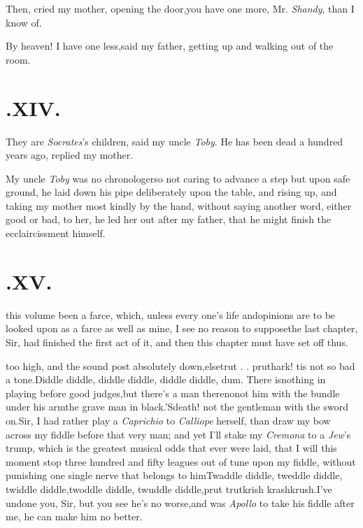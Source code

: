\documentclass{article}
\begin{document}
\vskip -2pt

\tsh  Then, cried my mother, opening the
door,\tsh you have one more, Mr. \textit{Shandy}, than I
know of.

\vskip -2pt

By heaven! I have one less,\tsk said my father, getting up and
walking out of the room.

\setlength{\baselineskip}{12.78pt}  %
\section{.\enspace  XIV.}

\quad\tsh They are \textit{Socrates}’s children, said my uncle
\textit{Toby}. He has been dead a hundred years ago, replied my
mother.

My uncle \textit{Toby} was no chronologer\tsk so not caring to
advance a step but upon safe ground, he laid down his pipe
deliberately upon the table, and rising up, and taking my mother
most kindly by the hand, without saying another word, either good
or bad, to her, he led her out after my father, that he might
finish the ecclaircissment himself.

\section{.\enspace  XV.}

 this volume been a farce,\break
which, unless every one’s life and\break opinions are to be looked upon as
a farce as well as mine, I see no reason to suppose\tsk the last
chapter, Sir, had finished
the first act of it, and then this
chapter must have set off thus.

\noindent
{}
too high, and the sound post absolutely
down,\tsk else\tsk trut . . prut\tsk hark! tis not so bad a
tone.\tsk Diddle diddle, diddle diddle, diddle diddle, dum.
There is\break nothing
in playing before good judges,\tsk but there’s a man
there\tsk no\tsk not him with the bundle under his arm\tsk the grave man
in black.\tsk ’Sdeath! not the gentleman with the sword on.\tsk Sir,
I had rather play a \textit{Caprichio} to \textit{Calliope} herself, than draw my
bow across my fiddle before that very man; and yet I’ll stake my
\textit{Cremona} to a \textit{Jew}’s trump, which is the greatest musical
odds that ever were laid, that I will this moment stop three hundred and fifty
leagues out of tune upon my fiddle, without punish\-ing one single nerve that
belongs to him\break\tsk Twaddle diddle, tweddle
diddle,\tsk\break
twiddle diddle,\tsk twoddle diddle,\tsk\break
twuddle diddle,\tsh prut trut\tsk krish\tsk\break
krash\tsk krush.\tsk I’ve undone you, Sir,\break
\tsk but you see he’s no worse,\tsk and was \textit{Apollo} to take
his fiddle after me, he can make him no better.
\end{document}
